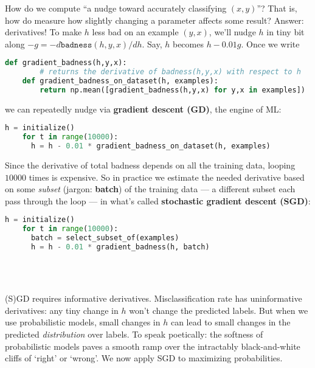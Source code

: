   How do we compute ``{a nudge toward accurately classifying $(x, y)$}''?  That
  is, how do measure how slightly changing a parameter affects some result?
  Answer: derivatives!  To make $h$ less bad on an example $(y, x)$, we'll
  nudge $h$ in tiny bit along $-g = -d \texttt{badness}(h,y,x) /
  dh$. Say, $h$ becomes $h-0.01g$.
  Once we write
  \begin{lstlisting}[language=Python, basicstyle=\footnotesize\ttfamily]
    def gradient_badness(h,y,x):
        # returns the derivative of badness(h,y,x) with respect to h
    def gradient_badness_on_dataset(h, examples):
        return np.mean([gradient_badness(h,y,x) for y,x in examples])
  \end{lstlisting}
  we can repeatedly nudge via \textbf{gradient descent (GD)}, the engine of ML:
  \begin{lstlisting}[language=Python, basicstyle=\footnotesize\ttfamily]
    h = initialize()
    for t in range(10000):
      h = h - 0.01 * gradient_badness_on_dataset(h, examples)
  \end{lstlisting}
  Since the derivative of total badness depends on all the training data,
  looping $10000$ times is expensive.  So in practice we estimate the needed
  derivative based on some \emph{subset} (jargon: \textbf{batch}) of the
  training data --- a different subset each pass through the loop --- in what's
  called \textbf{stochastic gradient descent (SGD)}:
  \begin{lstlisting}[language=Python, basicstyle=\footnotesize\ttfamily]
    h = initialize()
    for t in range(10000):
      batch = select_subset_of(examples)
      h = h - 0.01 * gradient_badness(h, batch)
  \end{lstlisting}
  \begin{marginfigure}
      \\
      \vspace{4cm}\\
  \end{marginfigure}

  (S)GD requires informative derivatives.  Misclassification rate has
  uninformative derivatives: any tiny change in $h$ won't change the predicted
  labels.  But when we use probabilistic models, small changes in $h$ can lead
  to small changes in the predicted \emph{distribution} over labels.
  To speak poetically: the softness of probabilistic models paves a smooth ramp
  over the intractably black-and-white cliffs of `right' or `wrong'.
  We now apply SGD to maximizing probabilities.

